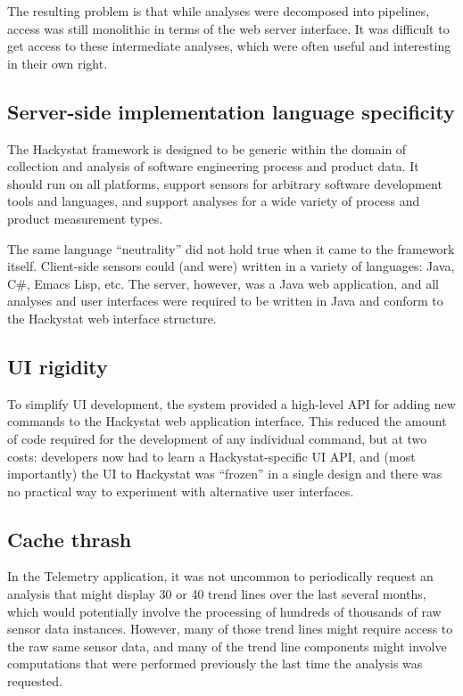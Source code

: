 \documentclass[conference,12pt]{IEEEtran}
\begin{document}
The resulting problem is that while analyses were decomposed into pipelines, access was still monolithic in terms of the web server interface. It was difficult to get access to these intermediate analyses, which were often useful and interesting in their own right. 

\subsection{Server-side implementation language specificity}

The Hackystat framework is designed to be generic within the domain of collection and analysis of software engineering process and product data.  It should run on all platforms, support sensors for arbitrary software development tools and languages, and support analyses for a wide variety of process and product measurement types. 

The same language ``neutrality'' did not hold true when it came to the framework itself.  Client-side sensors could (and were) written in a variety of languages: Java, C\#, Emacs Lisp, etc. The server, however, was a Java web application, and all analyses and user interfaces were required to be written in Java and conform to the Hackystat web interface structure.  

\subsection{UI rigidity}

To simplify UI development, the system provided a high-level API for adding
new commands to the Hackystat web application interface.  This reduced the
amount of code required for the development of any individual command, but
at two costs: developers now had to learn a Hackystat-specific UI API, and
(most importantly) the UI to Hackystat was ``frozen'' in a single design
and there was no practical way to experiment with alternative user
interfaces.

\subsection{Cache thrash}

In the Telemetry application, it was not uncommon to periodically request an analysis that might display 30 or 40 trend lines over the last several months, which would potentially involve the processing of hundreds of thousands of raw sensor data instances. However, many of those trend lines might require access to the raw same sensor data, and many of the trend line components might involve computations that were performed previously the last time the analysis was requested.  
\end{document}
